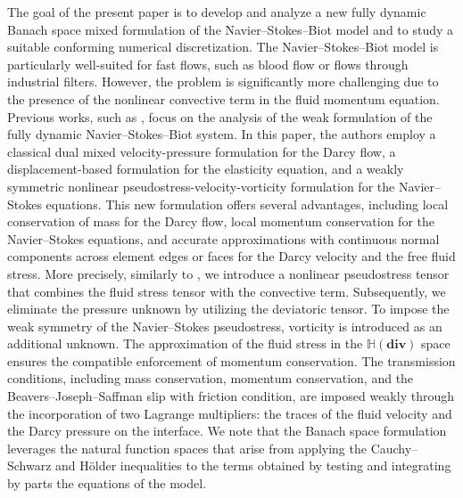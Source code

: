 \documentclass[11pt]{article}
\numberwithin{equation}{section}
\newcommand{\0}{{\mathbf{0}}}
\newcommand\bbH{\mathbb{H}}
\def\bdiv{\mathbf{div}}
\numberwithin{equation}{section}
\begin{document}
The goal of the present paper is to develop and analyze a new fully dynamic Banach space mixed formulation of the Navier--Stokes--Biot model and to study a suitable conforming numerical discretization. 
The Navier--Stokes--Biot model is particularly well-suited for fast flows, such as blood flow or flows through industrial filters. 
However, the problem is significantly more challenging due to the presence of the nonlinear convective term in the fluid momentum equation.
Previous works, such as \cite{Cesmelioglu2017,wy2022}, focus on the analysis of the weak formulation of the fully dynamic Navier--Stokes--Biot system. 
In this paper, the authors employ a classical dual mixed velocity-pressure formulation for the Darcy flow, a displacement-based formulation for the elasticity equation, and a weakly symmetric nonlinear pseudostress-velocity-vorticity formulation for the Navier--Stokes equations.
This new formulation offers several advantages, including local conservation of mass for the Darcy flow, local momentum conservation for the Navier--Stokes equations, and accurate approximations with continuous normal components across element edges or faces for the Darcy velocity and the free fluid stress.
More precisely, similarly to \cite{cot2017,cgo2021,lcy2022}, we introduce a nonlinear pseudostress tensor that combines the fluid stress tensor with the convective term. 
Subsequently, we eliminate the pressure unknown by utilizing the deviatoric tensor. 
To impose the weak symmetry of the Navier--Stokes pseudostress, vorticity is introduced as an additional unknown.
The approximation of the fluid stress in the $\bbH(\bdiv)$ space ensures the compatible enforcement of momentum conservation. 
The transmission conditions, including mass conservation, momentum conservation, and the Beavers--Joseph--Saffman slip with friction condition, are imposed weakly through the incorporation of two Lagrange multipliers: the traces of the fluid velocity and the Darcy pressure on the interface.
We note that the Banach space formulation leverages the natural function spaces that arise from applying the Cauchy--Schwarz and H\"older inequalities to the terms obtained by testing and integrating by parts the equations of the model.
\end{document}
